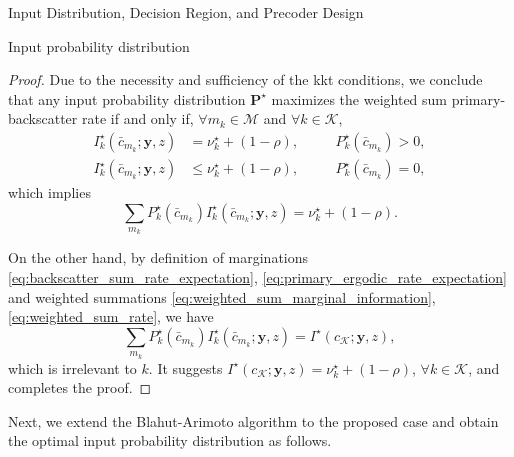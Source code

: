 \documentclass[journal]{IEEEtran}
\begin{document}
\begin{section}{Input Distribution, Decision Region, and Precoder Design}
\begin{subsection}{Input probability distribution}
\begin{proof}
				Due to the necessity and sufficiency of the \gls{kkt} conditions, we conclude that any input probability distribution $\boldsymbol{P}^\star$ maximizes the weighted sum primary-backscatter rate if and only if, $\forall m_k \in \mathcal{M}$ and $\forall k \in \mathcal{K}$,
				\begin{subequations}
					\begin{alignat}{2}
						I_k^\star(\bar{c}_{m_k};\boldsymbol{y},z) & = \nu_k^\star + (1 - \rho), \quad && P_k^\star(\bar{c}_{m_k}) > 0,\label{eq:probable_states_marginal}\\
						I_k^\star(\bar{c}_{m_k};\boldsymbol{y},z) & \le \nu_k^\star + (1 - \rho), \quad && P_k^\star(\bar{c}_{m_k}) = 0,\label{eq:dropped_states_marginal}
					\end{alignat}
				\end{subequations}
				which implies
				\begin{equation}
					\sum_{m_k} P_k^\star(\bar{c}_{m_k}) I_k^\star(\bar{c}_{m_k};\boldsymbol{y},z) = \nu_k^\star + (1 - \rho).
				\end{equation}

				On the other hand, by definition of marginations \eqref{eq:backscatter_sum_rate_expectation}, \eqref{eq:primary_ergodic_rate_expectation} and weighted summations \eqref{eq:weighted_sum_marginal_information}, \eqref{eq:weighted_sum_rate}, we have
				\begin{equation}
					\sum_{m_k} P_k^\star(\bar{c}_{m_k}) I_k^\star(\bar{c}_{m_k};\boldsymbol{y},z) = I^\star(c_{\mathcal{K}};\boldsymbol{y},z),
				\end{equation}
				which is irrelevant to $k$. It suggests $I^\star(c_{\mathcal{K}};\boldsymbol{y},z) = \nu_k^\star + (1 - \rho)$, $\forall k \in \mathcal{K}$, and completes the proof.
			\end{proof}

			Next, we extend the Blahut-Arimoto algorithm to the proposed case and obtain the optimal input probability distribution as follows.


\end{subsection}
\end{section}
\end{document}
